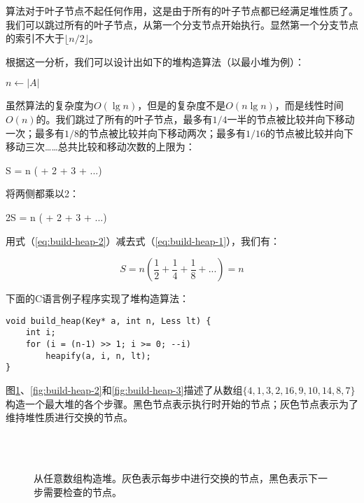 \documentclass[UTF8]{article}
\begin{document}
算法对于叶子节点不起任何作用，这是由于所有的叶子节点都已经满足堆性质了。我们可以跳过所有的叶子节点，从第一个分支节点开始执行。显然第一个分支节点的索引不大于$\lfloor n/2 \rfloor$。

根据这一分析，我们可以设计出如下的堆构造算法（以最小堆为例）：

\begin{algorithmic}[1]
  \State $n \gets |A|$
    \State {}
  \EndFor
\EndFunction
\end{algorithmic}

虽然算法的复杂度为$O(\lg n)$，但是的复杂度不是$O(n \lg n)$，而是线性时间$O(n)$的。我们跳过了所有的叶子节点，最多有$1/4$一半的节点被比较并向下移动一次；最多有$1/8$的节点被比较并向下移动两次；最多有$1/16$的节点被比较并向下移动三次……总共比较和移动次数的上限为：

\be
S = n ( + 2  + 3  + ...)
\label{eq:build-heap-1}
\ee

将两侧都乘以2：

\be
2S = n ( + 2  + 3  + ...)
\label{eq:build-heap-2}
\ee

用式（\ref{eq:build-heap-2}）减去式（\ref{eq:build-heap-1}），我们有：

\[
S = n (\frac{1}{2} + \frac{1}{4} + \frac{1}{8} + ...) = n
\]

下面的C语言例子程序实现了堆构造算法：

\lstset{language=C}
\begin{lstlisting}
void build_heap(Key* a, int n, Less lt) {
    int i;
    for (i = (n-1) >> 1; i >= 0; --i)
        heapify(a, i, n, lt);
}
\end{lstlisting}

图\ref{fig:build-heap-1}、\ref{fig:build-heap-2}和\ref{fig:build-heap-3}描述了从数组$\{4, 1, 3, 2, 16, 9, 10, 14, 8, 7\}$构造一个最大堆的各个步骤。黑色节点表示执行时开始的节点；灰色节点表示为了维持堆性质进行交换的节点。

\begin{figure}[htbp]
    \centering
     \\
     \\
    \caption{从任意数组构造堆。灰色表示每步中进行交换的节点，黑色表示下一步需要检查的节点。} \label{fig:build-heap-1}
\end{figure}
\end{document}
